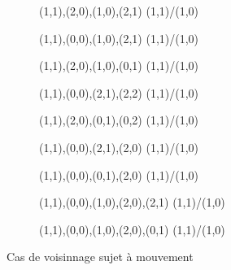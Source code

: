 \begin{figure}[h!]
\begin{subfigure}[b]{0.15\textwidth}
{       {{(1,1),(2,0),(1,0),(2,1)}}       {{{(1,1)/(1,0)}}}
    }
    \caption{}
  \end{subfigure}
  \begin{subfigure}[b]{0.15\textwidth}
    \resizebox{\linewidth}{!} {
       {{(1,1),(0,0),(1,0),(2,1)}}       {{{(1,1)/(1,0)}}}
    }
    \caption{}
  \end{subfigure}
  \begin{subfigure}[b]{0.15\textwidth}
    \resizebox{\linewidth}{!} {
       {{(1,1),(2,0),(1,0),(0,1)}}       {{{(1,1)/(1,0)}}}
    }
    \caption{}
  \end{subfigure}
  \begin{subfigure}[b]{0.15\textwidth}
    \resizebox{\linewidth}{!} {
       {{(1,1),(0,0),(2,1),(2,2)}}       {{{(1,1)/(1,0)}}}
    }
    \caption{}
  \end{subfigure}
  \begin{subfigure}[b]{0.15\textwidth}
    \resizebox{\linewidth}{!} {
       {{(1,1),(2,0),(0,1),(0,2)}}       {{{(1,1)/(1,0)}}}
    }
    \caption{}
  \end{subfigure}
  \begin{subfigure}[b]{0.15\textwidth}
    \resizebox{\linewidth}{!} {
       {{(1,1),(0,0),(2,1),(2,0)}}       {{{(1,1)/(1,0)}}}
    }
    \caption{}
  \end{subfigure}
  \begin{subfigure}[b]{0.15\textwidth}
    \resizebox{\linewidth}{!} {
       {{(1,1),(0,0),(0,1),(2,0)}}       {{{(1,1)/(1,0)}}}
    }
    \caption{}
  \end{subfigure}
  \begin{subfigure}[b]{0.15\textwidth}
    \resizebox{\linewidth}{!} {
       {{(1,1),(0,0),(1,0),(2,0),(2,1)}} {{{(1,1)/(1,0)}}}
    }
    \caption{}
  \end{subfigure}
  \begin{subfigure}[b]{0.15\textwidth}
    \resizebox{\linewidth}{!} {
       {{(1,1),(0,0),(1,0),(2,0),(0,1)}} {{{(1,1)/(1,0)}}}
    }
    \caption{}
  \end{subfigure}
  \caption{Cas de voisinnage sujet à mouvement}
  \label{fig:cas_mvt}
\end{figure}

